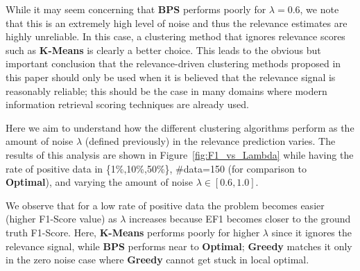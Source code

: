 While it may seem concerning that {\bf BPS} performs poorly for $\lambda=0.6$, we note that this is an extremely high level of noise and thus the relevance estimates are highly unreliable.  In this case, a clustering method that ignores relevance scores such as {\bf $\mathbf{K}$-Means} is clearly a better choice.  This leads to the obvious but important conclusion that the relevance-driven clustering methods proposed in this paper should only be used when it is believed that the relevance signal is reasonably reliable; this should be the case in many domains where modern information retrieval scoring techniques are already used.



  Here we aim to understand how the different clustering algorithms perform as the amount of noise $\lambda$ (defined previously) in the relevance prediction varies.
The results of this analysis are shown in Figure~\ref{fig:F1_vs_Lambda} while having the rate of positive data in \{1\%,10\%,50\%\}, \#data=150 (for comparison to {\bf Optimal}), and varying the amount of noise $\lambda \in [0.6,1.0]$.

We observe that for a low rate of positive data the problem becomes easier (higher F1-Score value) as $\lambda$ increases because EF1 becomes closer to the ground truth F1-Score.  Here, {\bf $\mathbf{K}$-Means} performs poorly for higher $\lambda$ since it ignores the relevance signal, while {\bf BPS} performs near to {\bf Optimal}; {\bf Greedy} matches it only in the zero noise case where {\bf Greedy} cannot get stuck in local optimal.


